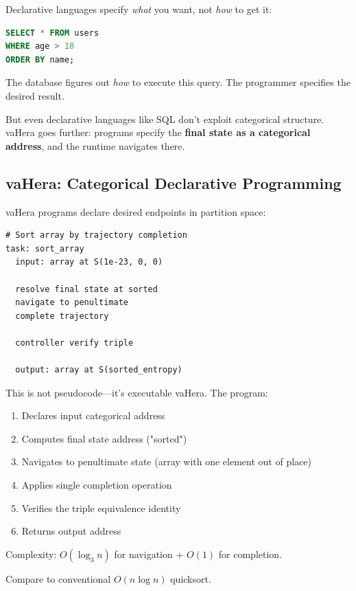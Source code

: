 \documentclass[twocolumn,10pt]{article}
\theoremstyle{definition}
\theoremstyle{remark}
\begin{document}
Declarative languages specify \emph{what} you want, not \emph{how} to get it:

\begin{lstlisting}[language=SQL,caption={Declarative SQL}]
SELECT * FROM users
WHERE age > 18
ORDER BY name;
\end{lstlisting}

The database figures out \emph{how} to execute this query. The programmer specifies the desired result.

But even declarative languages like SQL don't exploit categorical structure. vaHera goes further: programs specify the \textbf{final state as a categorical address}, and the runtime navigates there.

\subsection{vaHera: Categorical Declarative Programming}

vaHera programs declare desired endpoints in partition space:

\begin{lstlisting}[language=vaHera,caption={vaHera array sort}]
# Sort array by trajectory completion
task: sort_array
  input: array at S(1e-23, 0, 0)

  resolve final state at sorted
  navigate to penultimate
  complete trajectory

  controller verify triple

  output: array at S(sorted_entropy)
\end{lstlisting}

This is not pseudocode—it's executable vaHera. The program:
\begin{enumerate}
    \item Declares input categorical address
    \item Computes final state address ("sorted")
    \item Navigates to penultimate state (array with one element out of place)
    \item Applies single completion operation
    \item Verifies the triple equivalence identity
    \item Returns output address
\end{enumerate}

Complexity: $O(\log_3 n)$ for navigation + $O(1)$ for completion.

Compare to conventional $O(n \log n)$ quicksort.
\end{document}
